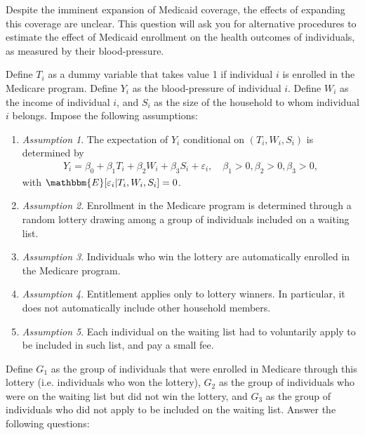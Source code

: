 \documentclass[11pt,letterpaper]{article}
\begin{document}
\bigskip

Despite the imminent expansion of Medicaid coverage, the effects of expanding this coverage are unclear. This question will ask you for alternative procedures to estimate the effect of Medicaid enrollment on the health outcomes of individuals, as measured by their blood-pressure. 

Define $T_{i}$ as a dummy variable that takes value 1 if individual $i$ is enrolled in the Medicare program. Define $Y_{i}$ as the blood-pressure of individual $i$. Define $W_{i}$ as the income of individual $i$, and $S_{i}$ as the size of the household to whom individual $i$ belongs. Impose the following assumptions:
\begin{enumerate}
	\item \textit{Assumption 1}. The expectation of $Y_{i}$ conditional on $(T_{i},W_{i},S_{i})$ is determined by
	\begin{align*}
	Y_{i}=\beta_{0}+\beta_{1}T_{i}+\beta_{2}W_{i}+\beta_{3}S_{i}+\varepsilon_{i},\quad\beta_{1}>0,\beta_{2}>0,\beta_{3}>0,
	\label{eq: structeq}
	\end{align*}
	with $\mathbbm{E}[\varepsilon_{i}|T_{i},W_{i},S_{i}]=0$.
	\item \textit{Assumption 2}. Enrollment in the Medicare program is determined through a random lottery drawing among a group of individuals included on a waiting list.
	\item \textit{Assumption 3}. Individuals who win the lottery are automatically enrolled in the Medicare program.
	\item \textit{Assumption 4}. Entitlement applies only to lottery winners. In particular, it does not automatically include other household members.
	\item \textit{Assumption 5}. Each individual on the waiting list had to voluntarily apply to be included in such list, and pay a small fee.
\end{enumerate}
Define $G_{1}$ as the group of individuals that were enrolled in Medicare through this lottery (i.e. individuals who won the lottery), $G_{2}$ as the group of individuals who were on the waiting list but did not win the lottery, and $G_{3}$ as the group of individuals who did not apply to be included on the waiting list. Answer the following questions:
\end{document}
